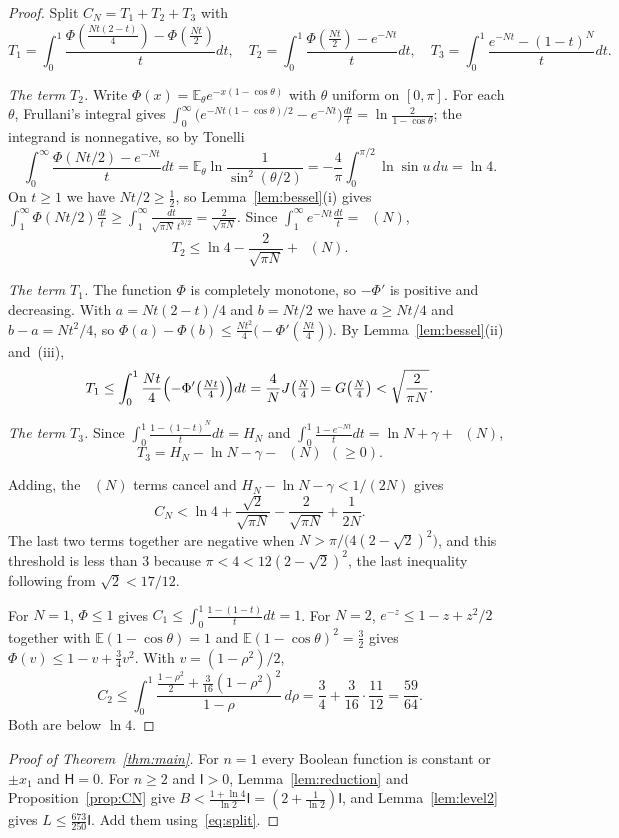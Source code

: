 \documentclass[11pt]{amsart}
\theoremstyle{definition}
\theoremstyle{remark}
\newcommand{\E}{\mathbb E}
\newcommand{\HH}{\mathsf H}
\newcommand{\I}{\mathsf I}
\DeclareMathOperator{\Ei}{E_1}
\begin{document}
\begin{proof}
Split $C_N=T_1+T_2+T_3$ with
\[
 T_1=\int_0^1\frac{\Phi(\frac{Nt(2-t)}4)-\Phi(\frac{Nt}2)}{t}dt,\quad
 T_2=\int_0^1\frac{\Phi(\frac{Nt}2)-e^{-Nt}}{t}dt,\quad
 T_3=\int_0^1\frac{e^{-Nt}-(1-t)^N}{t}dt.
\]

\emph{The term $T_2$.} Write $\Phi(x)=\E_\theta e^{-x(1-\cos\theta)}$ with $\theta$ uniform on $[0,\pi]$. For each $\theta$, Frullani's integral gives $\int_0^\infty\bigl(e^{-Nt(1-\cos\theta)/2}-e^{-Nt}\bigr)\frac{dt}t=\ln\frac2{1-\cos\theta}$; the integrand is nonnegative, so by Tonelli
\[
 \int_0^\infty\frac{\Phi(Nt/2)-e^{-Nt}}{t}dt=\E_\theta\ln\frac{1}{\sin^2(\theta/2)}=-\frac4\pi\int_0^{\pi/2}\ln\sin u\,du=\ln4.
\]
On $t\ge1$ we have $Nt/2\ge\tfrac12$, so Lemma~\ref{lem:bessel}(i) gives $\int_1^\infty\Phi(Nt/2)\frac{dt}t\ge\int_1^\infty\frac{dt}{\sqrt{\pi N}\,t^{3/2}}=\frac2{\sqrt{\pi N}}$. Since $\int_1^\infty e^{-Nt}\frac{dt}t=\Ei(N)$,
\[
 T_2\le\ln4-\frac2{\sqrt{\pi N}}+\Ei(N).
\]

\emph{The term $T_1$.} The function $\Phi$ is completely monotone, so $-\Phi'$ is positive and decreasing. With $a=Nt(2-t)/4$ and $b=Nt/2$ we have $a\ge Nt/4$ and $b-a=Nt^2/4$, so $\Phi(a)-\Phi(b)\le\frac{Nt^2}4\bigl(-\Phi'(\frac{Nt}4)\bigr)$. By Lemma~\ref{lem:bessel}(ii) and~(iii),
\[
 T_1\le\int_0^1\frac{Nt}4\Bigl(-\Phi'\bigl(\tfrac{Nt}4\bigr)\Bigr)dt=\frac4NJ\bigl(\tfrac N4\bigr)=G\bigl(\tfrac N4\bigr)<\sqrt{\frac{2}{\pi N}}.
\]

\emph{The term $T_3$.} Since $\int_0^1\frac{1-(1-t)^N}{t}dt=H_N$ and $\int_0^1\frac{1-e^{-Nt}}tdt=\ln N+\gamma+\Ei(N)$,
\[
 T_3=H_N-\ln N-\gamma-\Ei(N)\ \ (\ge0).
\]

Adding, the $\Ei(N)$ terms cancel and $H_N-\ln N-\gamma<1/(2N)$ gives
\[
 C_N<\ln4+\frac{\sqrt2}{\sqrt{\pi N}}-\frac{2}{\sqrt{\pi N}}+\frac1{2N}.
\]
The last two terms together are negative when $N>\pi/\bigl(4(2-\sqrt2)^2\bigr)$, and this threshold is less than $3$ because $\pi<4<12(2-\sqrt2)^2$, the last inequality following from $\sqrt2<17/12$.

For $N=1$, $\Phi\le1$ gives $C_1\le\int_0^1\frac{1-(1-t)}tdt=1$. For $N=2$, $e^{-z}\le1-z+z^2/2$ together with $\E(1-\cos\theta)=1$ and $\E(1-\cos\theta)^2=\tfrac32$ gives $\Phi(v)\le1-v+\tfrac34v^2$. With $v=(1-\rho^2)/2$,
\[
 C_2\le\int_0^1\frac{\frac{1-\rho^2}2+\frac3{16}(1-\rho^2)^2}{1-\rho}\,d\rho=\frac34+\frac3{16}\cdot\frac{11}{12}=\frac{59}{64}.
\]
Both are below $\ln4$.
\end{proof}

\begin{proof}[Proof of Theorem~\ref{thm:main}]
For $n=1$ every Boolean function is constant or $\pm x_1$ and $\HH=0$. For $n\ge2$ and $\I>0$, Lemma~\ref{lem:reduction} and Proposition~\ref{prop:CN} give $B<\frac{1+\ln4}{\ln2}\I=(2+\frac1{\ln2})\I$, and Lemma~\ref{lem:level2} gives $L\le\frac{673}{250}\I$. Add them using~\eqref{eq:split}.
\end{proof}
\end{document}
